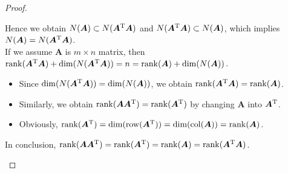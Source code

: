 \begin{enumerate}
\begin{proof}
\begin{enumerate}
\begin{itemize}
\end{itemize}
Hence we obtain $N(\bm A)\subset N(\bm A^{\mathrm T}\bm A)$ and $N(\bm A^{\mathrm T}\bm A)\subset N(\bm A)$, which implies $N(\bm A)= N(\bm A^{\mathrm T}\bm A)$.\\
If we assume $\bm A$ is $m\times n$ matrix, then $\operatorname{rank}(\bm A^{\mathrm T}\bm A)+\dim(N(\bm A^{\mathrm T}\bm A))=n=\operatorname{rank}(\bm A)+\dim(N(\bm A))$. 
\begin{itemize}
\item
Since $\dim(N(\bm A^{\mathrm T}\bm A))=\dim(N(\bm A))$, we obtain $\operatorname{rank}(\bm A^{\mathrm T}\bm A)=\operatorname{rank}(\bm A)$.
\item
Similarly, we obtain $\operatorname{rank}(\bm A\bm A^{\mathrm T})=\operatorname{rank}(\bm A^{\mathrm T})$ by changing $\bm A$ into $\bm A^{\mathrm T}$.
\item
Obviously, $\operatorname{rank}(\bm A^{\mathrm T})=\dim(\operatorname{row}(\bm A^{\mathrm T}))=\dim(\operatorname{col}(\bm A))=\operatorname{rank}(\bm A)$.
\end{itemize}
In conclusion, $\operatorname{rank}(\bm A\bm A^{\mathrm T})=\operatorname{rank}(\bm A^{\mathrm T})=\operatorname{rank}(\bm A)=\operatorname{rank}(\bm A^{\mathrm T}\bm A)$.
\end{enumerate}
\end{proof}
\end{enumerate}